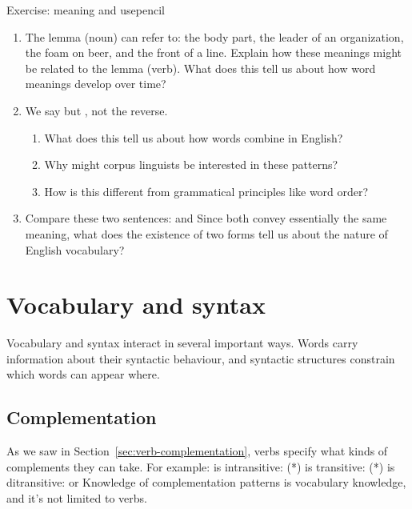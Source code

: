 \begin{tblsframedsymbol}{Exercise: meaning and use}{pencil}
\begin{enumerate}[noitemsep, leftmargin=*]
    \item The lemma  (noun) can refer to: the body part, the leader of an organization, the foam on beer, and the front of a line. Explain how these meanings might be related to the lemma  (verb). What does this tell us about how word meanings develop over time?

    \item We say  but , not the reverse.
    \begin{enumerate}[nosep]
        \item What does this tell us about how words combine in English?
        \item Why might corpus linguists be interested in these patterns?
        \item How is this different from grammatical principles like word order?
    \end{enumerate}

    \item Compare these two sentences:  and  Since both convey essentially the same meaning, what does the existence of two forms tell us about the nature of English vocabulary?
\end{enumerate}
\end{tblsframedsymbol}

\section{Vocabulary and syntax} \label{sec:vocab-syntax}

Vocabulary and syntax interact in several important ways. Words carry information about their syntactic behaviour, and syntactic structures constrain which words can appear where.

\subsection{Complementation}\label{ssec:complementation}

As we saw in Section~\ref{sec:verb-complementation}, verbs specify what kinds of complements they can take. For example:
\ea
    \ea {} is intransitive:  (*)
    \ex {} is transitive:  (*)
    \ex {} is ditransitive:  or 
    \z
\z
Knowledge of complementation patterns is vocabulary knowledge, and it's not limited to verbs.

